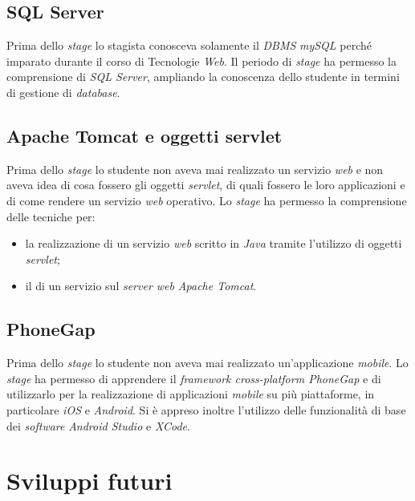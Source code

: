 \subsection{SQL Server}

Prima dello \textit{stage} lo stagista conosceva solamente il \textit{DBMS} \textit{mySQL} perché imparato durante il corso di Tecnologie \textit{Web}. Il periodo di \textit{stage} ha permesso la comprensione di \textit{SQL Server}, ampliando la conoscenza dello studente in termini di gestione di \textit{database}.

\subsection{Apache Tomcat e oggetti servlet}

Prima dello \textit{stage} lo studente non aveva mai realizzato un servizio \textit{web} e non aveva idea di cosa fossero gli oggetti \textit{servlet}, di quali fossero le loro applicazioni e di come rendere un servizio \textit{web} operativo. Lo \textit{stage} ha permesso la comprensione delle tecniche per:
\begin{itemize}
	\item la realizzazione di un servizio \textit{web} scritto in \textit{Java} tramite l'utilizzo di oggetti \textit{servlet};
	\item il  di un servizio sul \textit{server web} \textit{Apache Tomcat}.
\end{itemize}

\subsection{PhoneGap}

Prima dello \textit{stage} lo studente non aveva mai realizzato un'applicazione \textit{mobile}. Lo \textit{stage} ha permesso di apprendere il \textit{framework cross-platform PhoneGap} e di utilizzarlo per la realizzazione di applicazioni \textit{mobile} su più piattaforme, in particolare \textit{iOS} e \textit{Android}. Si è appreso inoltre l'utilizzo delle funzionalità di base dei \textit{software} \textit{Android Studio} e \textit{XCode}.

\section{Sviluppi futuri}

